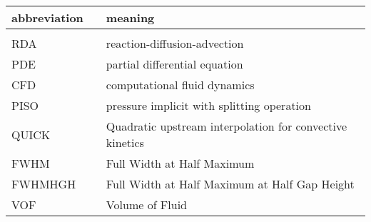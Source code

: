 \documentclass[../thesis.tex]{subfiles}
\begin{document}
\small
\begin{tabular}{p{4cm}p{3cm}p{8cm}}
	\textbf{abbreviation} & & \textbf{meaning} \\ 
	\hline \\[\dimexpr-\normalbaselineskip+2pt] 
	RDA & & reaction-diffusion-advection \\
	PDE & & partial differential equation \\
	CFD && computational fluid dynamics \\
	PISO & & pressure implicit with splitting operation \\
	QUICK & & Quadratic upstream interpolation for convective kinetics \\
	FWHM & & Full Width at Half Maximum \\
	FWHMHGH & & Full Width at Half Maximum at Half Gap Height \\
	VOF & & Volume of Fluid \\
\end{tabular}

\listoffigures
\listoftables
\end{document}
